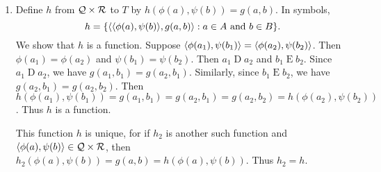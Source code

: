 \begin{solution}
\begin{enumerate}[label=(\alph*)]
    \item Define $h$ from $\mathcal{Q}\times \mathcal{R}$ to $T$ by $h(\phi(a),\psi(b))=g(a,b)$.
    In symbols, \[h=\setb{\aprn{\aprn{\phi(a),\psi(b)}, g(a,b)}}{a\in A\land b\in B}.\]
    We show that $h$ is a function.
    Suppose $\left\langle\phi(a_1),\psi(b_1)\right\rangle = \left\langle\phi(a_2),\psi(b_2)\right\rangle$.
    Then $\phi(a_1)=\phi(a_2)$ and $\psi(b_1)=\psi(b_2)$.
    Then $a_1\mathrel D a_2$ and $b_1\mathrel E b_2$.
    Since $a_1\mathrel D a_2$, we have $g(a_1,b_1)=g(a_2,b_1)$.
    Similarly, since $b_1\mathrel E b_2$, we have $g(a_2,b_1)=g(a_2,b_2)$.
    Then $h(\phi(a_1),\psi(b_1))=g(a_1,b_1)=g(a_2,b_1)=g(a_2,b_2)=h(\phi(a_2),\psi(b_2))$.
    Thus $h$ is a function.

    This function $h$ is unique, for if $h_2$ is another such function and
    $\left\langle\phi(a),\psi(b)\right\rangle\in \mathcal{Q}\times \mathcal{R}$, then
    $h_2(\phi(a),\psi(b))=g(a,b)=h(\phi(a),\psi(b))$. Thus $h_2=h$.
\end{enumerate}
\end{solution}
